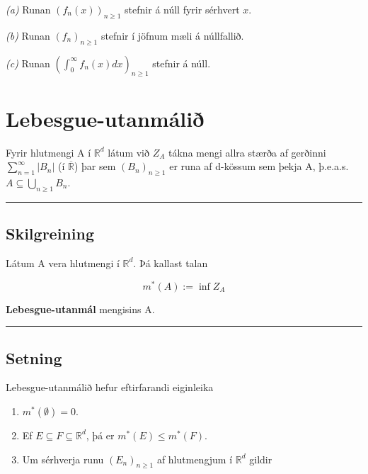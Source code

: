 \documentclass[]{book}
\begin{document}
\emph{(a)} Runan \((f_n(x))_{n\geq1}\) stefnir á núll fyrir sérhvert \(x\).

\emph{(b)} Runan \((f_n)_{n\geq1}\) stefnir í jöfnum mæli á núllfallið.

\emph{(c)} Runan \((\int_0^\infty f_n(x)dx)_{n\geq 1}\) stefnir á núll.

\hypertarget{lebesgue-utanmali}{%
\chapter{Lebesgue-utanmálið}\label{lebesgue-utanmali}}

Fyrir hlutmengi A í \(\mathbb R^d\) látum við \(Z_A\) tákna mengi allra stærða af gerðinni \(\sum_{n=1}^\infty|B_n|\) (í \(\overline{\mathbb R}\)) þar sem \((B_n)_{n\geq1}\) er runa af d-kössum sem þekja A, þ.e.a.s. \(A \subseteq \bigcup_{n\geq1}B_n\).

\begin{center}\rule{0.5\linewidth}{\linethickness}\end{center}

\hypertarget{skilgreining-5}{%
\section{Skilgreining}\label{skilgreining-5}}

Látum A vera hlutmengi í \(\mathbb R^d\). Þá kallast talan

\[
m^*(A) := \inf Z_A
\]

\textbf{Lebesgue-utanmál} mengisins A.

\begin{center}\rule{0.5\linewidth}{\linethickness}\end{center}

\hypertarget{setning-18}{%
\section{Setning}\label{setning-18}}

Lebesgue-utanmálið hefur eftirfarandi eiginleika

\begin{enumerate}
\def\labelenumi{\arabic{enumi}.}
\item
  \(m^*(\emptyset) = 0\).
\item
  Ef \(E\subseteq F \subseteq \mathbb R^d\), þá er \(m^*(E) \leq m^*(F)\).
\item
  Um sérhverja runu \((E_n)_{n\geq1}\) af hlutmengjum í \(\mathbb R^d\) gildir
\end{enumerate}
\end{document}
